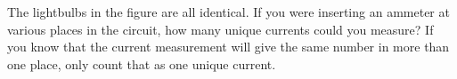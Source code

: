 The lightbulbs in the figure are all identical. If you were inserting an ammeter
at various places in the circuit, how many unique currents could you measure?
If you know that the current measurement will give the same number in more than
one place, only count that as one unique current.
